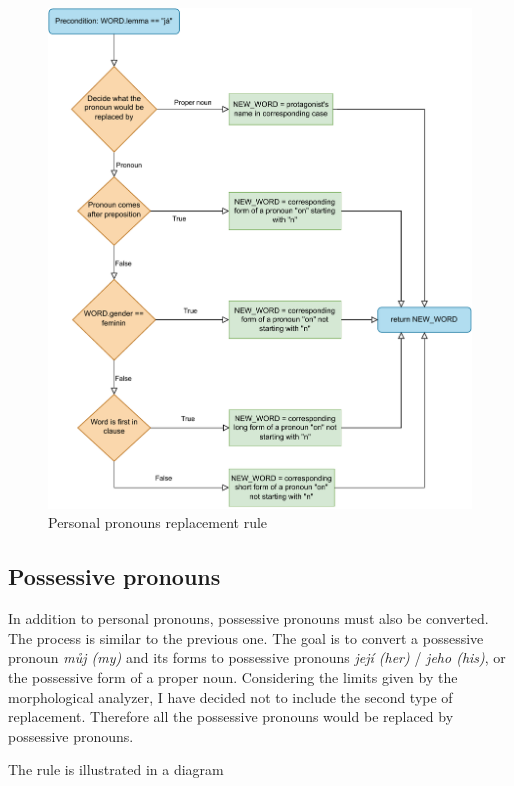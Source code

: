 \begin{figure}[ht!]
\includegraphics[width=\textwidth]{data/Icher-Perspron-Rule.pdf}
\caption{Personal pronouns replacement rule}
\label{fig:icher-perspron-rule}
\end{figure}

\subsection{Possessive pronouns}

In addition to personal pronouns, possessive pronouns must also be converted. The process is similar to the previous one. The goal is to convert a possessive pronoun \emph{můj (my)} and its forms to possessive pronouns \emph{její (her)} / \emph{jeho (his)}, or the possessive form of a proper noun. Considering the limits given by the morphological analyzer, I have decided not to include the second type of replacement. Therefore all the possessive pronouns would be replaced by possessive pronouns.

The rule is illustrated in a diagram %



